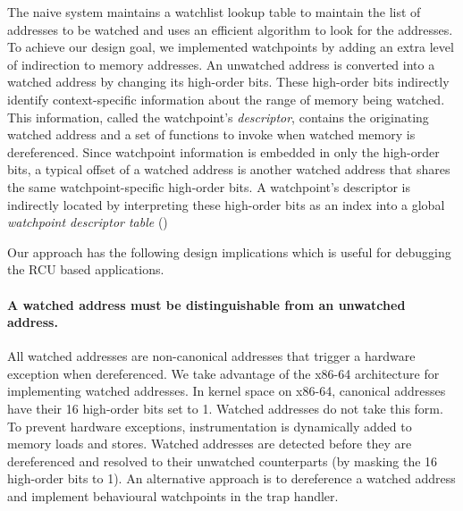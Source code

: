 The naive system maintains a watchlist lookup table to maintain the list of addresses to be watched and uses an efficient algorithm to look for the addresses.%
To achieve our design goal, we implemented watchpoints by adding an extra level of indirection to memory addresses. An unwatched address is converted into a watched address by changing its high-order bits. These high-order bits indirectly identify context-specific information about the range of memory being watched. This information, called the watchpoint's \emph{descriptor}, contains the originating watched address and a set of functions to invoke when watched memory is dereferenced. Since watchpoint information is embedded in only the high-order bits, a typical offset of a watched address is another watched address that shares the same watchpoint-specific high-order bits. A watchpoint's descriptor is indirectly located by interpreting these high-order bits as an index into a global \emph{watchpoint descriptor table} ()

Our approach has the following design implications which is useful for debugging the RCU based applications.



\paragraph{A watched address must be distinguishable from an unwatched address.} All watched addresses are non-canonical addresses that trigger a hardware exception when dereferenced. We take advantage of the x86-64 architecture for implementing watched addresses. In kernel space on x86-64, canonical addresses have their 16 high-order bits set to 1. Watched addresses do not take this form. To prevent hardware exceptions, instrumentation is dynamically added to memory loads and stores. Watched addresses are detected before they are dereferenced and resolved to their unwatched counterparts (by masking the 16 high-order bits to 1). An alternative approach is to dereference a watched address and implement behavioural watchpoints in the trap handler.
	
